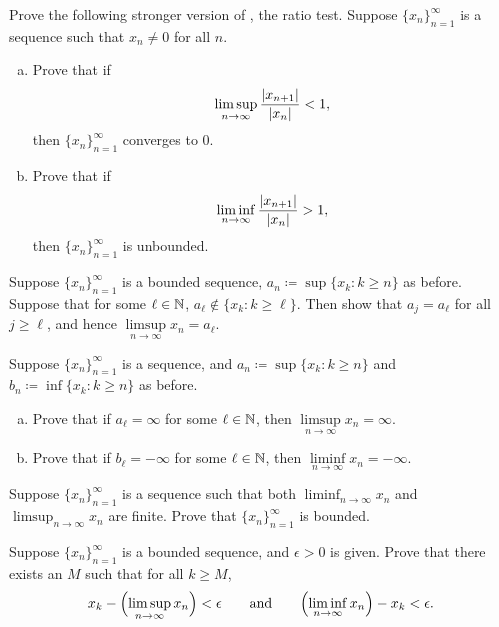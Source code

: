 \begin{exercise} \label{exercise:strongerratiotest2}
Prove the following stronger version of , the ratio
test.
Suppose $\{ x_n \}_{n=1}^\infty$ is a sequence such that $x_n \neq 0$ for all
$n$.
\begin{enumerate}[a)]
\item
Prove that if
\begin{equation*}
\limsup_{n \to \infty} \frac{\lvert {x_{n+1}} \rvert}{\lvert {x_n} \rvert} < 1 ,
\end{equation*}
then $\{ x_n \}_{n=1}^\infty$ converges to $0$.
\item
Prove that if
\begin{equation*}
\liminf_{n \to \infty} \frac{\lvert {x_{n+1}} \rvert}{\lvert {x_n} \rvert} > 1 ,
\end{equation*}
then $\{ x_n \}_{n=1}^\infty$ is unbounded.
\end{enumerate}
\end{exercise}

\begin{exercise}
Suppose $\{ x_n \}_{n=1}^\infty$ is a bounded sequence, $a_n \coloneqq \sup \{ x_k : k \geq n \}$
as before.  Suppose that for some $\ell \in {\mathbb{N}}$,
$a_\ell \notin \{ x_k : k \geq \ell \}$.  Then show that $a_j = a_\ell$ for all $j \geq \ell$, and hence
$\limsup\limits_{n\to\infty} x_n = a_\ell$.
\end{exercise}

\begin{exercise}
Suppose $\{ x_n \}_{n=1}^\infty$ is a sequence,
and $a_n \coloneqq \sup \{ x_k : k \geq n \}$ and
$b_n \coloneqq \inf \{ x_k : k \geq n \}$ as before.
\begin{enumerate}[a)]
\item
Prove that if $a_\ell = \infty$ for some $\ell \in {\mathbb{N}}$, then 
$\limsup\limits_{n\to\infty} x_n = \infty$.
\item
Prove that if $b_\ell = -\infty$ for some $\ell \in {\mathbb{N}}$, then 
$\liminf\limits_{n\to\infty} x_n = -\infty$.
\end{enumerate}
\end{exercise}

\begin{exercise}
Suppose $\{ x_n \}_{n=1}^\infty$ is a sequence
such that both $\liminf_{n\to\infty} x_n$ and
$\limsup_{n\to\infty} x_n$  are finite.  Prove that $\{ x_n \}_{n=1}^\infty$ is bounded.
\end{exercise}

\begin{exercise}
Suppose $\{ x_n \}_{n=1}^\infty$ is a bounded sequence, and $\epsilon > 0$ is given.
Prove that there exists an $M$ such that for all $k \geq M$,
\begin{equation*}
x_k - \Bigl(\limsup_{n\to\infty} x_n\Bigr) < \epsilon \qquad \text{and} \qquad
\Bigl(\liminf_{n\to\infty} x_n\Bigr) - x_k < \epsilon .
\end{equation*}
\end{exercise}

